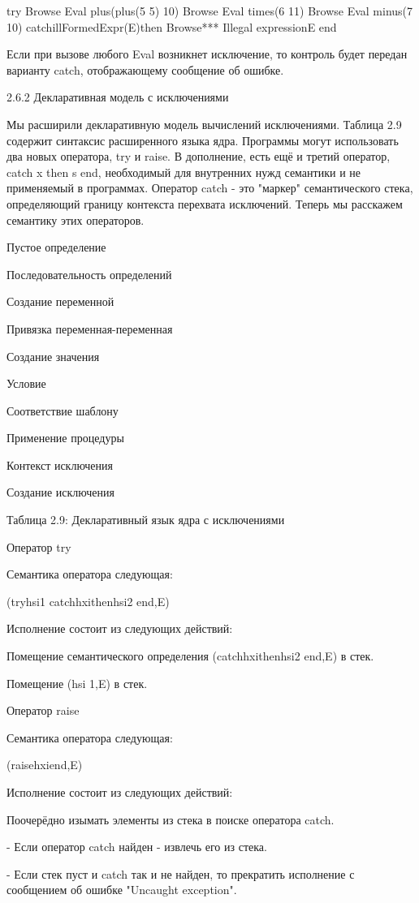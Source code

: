 try
{Browse {Eval plus(plus(5 5) 10)}}
{Browse {Eval times(6 11)}}
{Browse {Eval minus(7 10)}}
catchillFormedExpr(E)then
{Browse*** Illegal expressionE}
end

Если при вызове любого Eval возникнет исключение, то контроль будет передан варианту catch, отображающему сообщение об ошибке.

2.6.2 Декларативная модель с исключениями

Мы расширили декларативную модель вычислений исключениями. Таблица 2.9 содержит синтаксис расширенного языка ядра. Программы могут использовать два новых оператора, try и raise. В дополнение, есть ещё и третий оператор, catch x then s end, необходимый для внутренних нужд семантики и не применяемый в программах. Оператор catch - это "маркер" семантического стека, определяющий границу контекста перехвата исключений. Теперь мы расскажем семантику этих операторов.

Пустое определение

Последовательность определений

Создание переменной

Привязка переменная-переменная

Создание значения

Условие

Соответствие шаблону

Применение процедуры

Контекст исключения

Создание исключения

Таблица 2.9: Декларативный язык ядра с исключениями

Оператор try

Семантика оператора следующая:

(tryhsi1 catchhxithenhsi2 end,E)

Исполнение состоит из следующих действий:

Помещение семантического определения (catchhxithenhsi2 end,E) в стек.

Помещение  (hsi 1,E) в стек.

Оператор raise

Семантика оператора следующая:

(raisehxiend,E)

Исполнение состоит из следующих действий:

Поочерёдно изымать элементы из стека в поиске оператора catch.

- Если оператор catch найден - извлечь его из стека.

- Если стек пуст и catch так и не найден, то прекратить исполнение с сообщением об ошибке "Uncaught exception".

